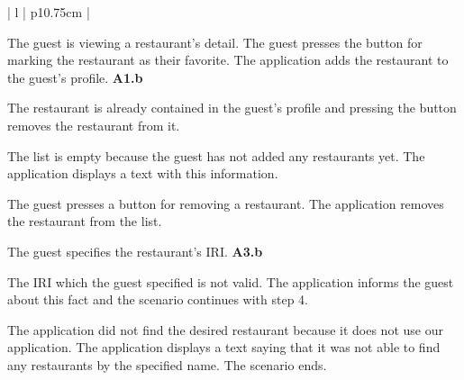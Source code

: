\begin{center}
\begin{tabular}{| l | p{10.75cm} | }
\begin{minipage}[t]{\linewidth}
\begin{description}[nosep,after=\strut]
        \item [A1:] The guest is viewing a restaurant's detail. The guest presses the button for marking the restaurant as their favorite. The application adds the restaurant to the guest's profile. \textbf{A1.b}
        \item [A1.b:] The restaurant is already contained in the guest's profile and pressing the button removes the restaurant from it.
        \item [A2:] The list is empty because the guest has not added any restaurants yet. The application displays a text with this information.
        \item [A3:] The guest presses a button for removing a restaurant. The application removes the restaurant from the list.
        \item [A4:] The guest specifies the restaurant's IRI. \textbf{A3.b}   
        \item [A4.b:] The IRI which the guest specified is not valid. The application informs the guest about this fact and the scenario continues with step 4.
        \item [A5:] The application did not find the desired restaurant because it does not use our application. The application displays a text saying that it was not able to find any restaurants by the specified name. The scenario ends.
      \end{description}
    \end{minipage}
    \\
    \hline
  \end{tabular}
  \newline
\end{center}

\newpage